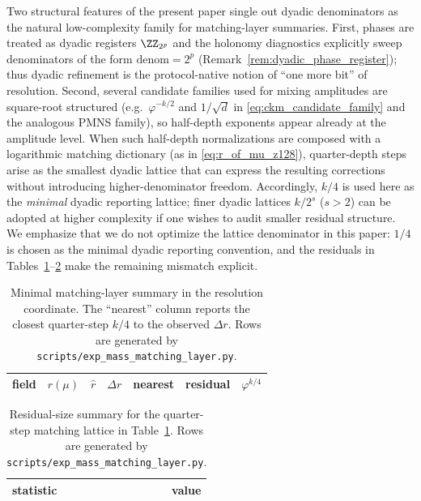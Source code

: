 \begin{remark}\label{rem:quarter_depth_minimal_dyadic}
Two structural features of the present paper single out dyadic denominators as the natural low-complexity family for matching-layer summaries.
First, phases are treated as dyadic registers $\ZZ_{2^p}$ and the holonomy diagnostics explicitly sweep denominators of the form $\mathrm{denom}=2^p$ (Remark~\ref{rem:dyadic_phase_register}); thus dyadic refinement is the protocol-native notion of ``one more bit'' of resolution.
Second, several candidate families used for mixing amplitudes are square-root structured (e.g.\ $\varphi^{-k/2}$ and $1/\sqrt{d}$ in \eqref{eq:ckm_candidate_family} and the analogous PMNS family), so half-depth exponents appear already at the amplitude level.
When such half-depth normalizations are composed with a logarithmic matching dictionary (as in \eqref{eq:r_of_mu_z128}), quarter-depth steps arise as the smallest dyadic lattice that can express the resulting corrections without introducing higher-denominator freedom.
Accordingly, $k/4$ is used here as the \emph{minimal} dyadic reporting lattice; finer dyadic lattices $k/2^s$ ($s>2$) can be adopted at higher complexity if one wishes to audit smaller residual structure.
We emphasize that we do not optimize the lattice denominator in this paper: $1/4$ is chosen as the minimal dyadic reporting convention, and the residuals in Tables~\ref{tab:mass_matching_layer}--\ref{tab:mass_matching_layer_summary} make the remaining mismatch explicit.
\end{remark}

\begin{table}[t]
\centering
\small
\setlength{\tabcolsep}{6pt}
\renewcommand{\arraystretch}{1.15}
\begin{tabular}{lrrrrrr}
\toprule
field & $r(\mu)$ & $\widehat r$ & $\Delta r$ & nearest & residual & $\varphi^{k/4}$ \\
\midrule
%
\end{tabular}
\caption{Minimal matching-layer summary in the resolution coordinate. The ``nearest'' column reports the closest quarter-step $k/4$ to the observed $\Delta r$. Rows are generated by \texttt{scripts/exp\_mass\_matching\_layer.py}.}
\label{tab:mass_matching_layer}
\end{table}

\begin{table}[t]
\centering
\small
\setlength{\tabcolsep}{10pt}
\renewcommand{\arraystretch}{1.15}
\begin{tabular}{lr}
\toprule
statistic & value \\
\midrule
%
\end{tabular}
\caption{Residual-size summary for the quarter-step matching lattice in Table~\ref{tab:mass_matching_layer}. Rows are generated by \texttt{scripts/exp\_mass\_matching\_layer.py}.}
\label{tab:mass_matching_layer_summary}
\end{table}


